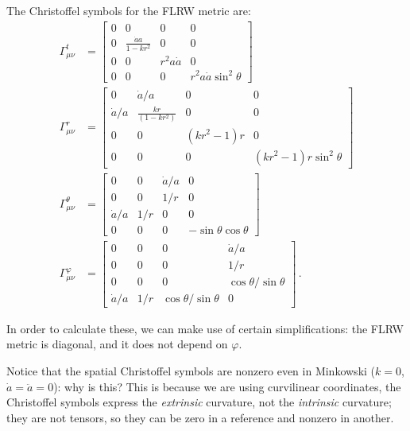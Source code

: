 \documentclass[main.tex]{subfiles}
\begin{document}
\begin{claim}
The Christoffel symbols for the FLRW metric are: 
%
\begin{subequations}
\begin{align}
\Gamma^{t}_{\mu \nu } &= \left[\begin{array}{cccc}
0 & 0 & 0 & 0 \\ 
0 & \frac{\dot{a}a}{1-kr^2} & 0 & 0 \\ 
0 & 0 & r^2a \dot{a} & 0 \\ 
0 & 0 & 0 & r^2 a \dot{a} \sin^2\theta 
\end{array}\right] \\
\Gamma^{r}_{\mu \nu } &= \left[\begin{array}{cccc}
0 & \dot{a} / a & 0 & 0 \\ 
\dot{a} / a & \frac{kr}{(1-kr^2)} & 0 & 0 \\ 
0 & 0 & (kr^2-1)r & 0 \\ 
0 & 0 & 0 & (kr^2-1)r \sin^2\theta 
\end{array}\right] \\
\Gamma^{\theta }_{\mu \nu } &= \left[\begin{array}{cccc}
0 & 0 & \dot{a} / a & 0 \\ 
0 & 0 & 1 / r & 0 \\ 
\dot{a} / a & 1/r & 0 & 0 \\ 
0 & 0 & 0 & - \sin \theta \cos \theta 
\end{array}\right] \\
\Gamma^{\varphi }_{\mu \nu } &= \left[\begin{array}{cccc}
0 & 0 & 0 & \dot{a} / a \\ 
0 & 0 & 0 & 1/r \\ 
0 & 0 & 0 & \cos \theta  /\sin \theta  \\ 
\dot{a} /a  & 1/r & \cos \theta  /\sin \theta  & 0
\end{array}\right]
\,.
\end{align}
\end{subequations}
\end{claim}

In order to calculate these, we can make use of certain simplifications: the FLRW metric is diagonal, and it does not depend on \(\varphi \).

Notice that the spatial Christoffel symbols are nonzero even in Minkowski (\(k=0\), \(\dot{a} = \ddot{a} =  0\)): why is this?
This is because we are using curvilinear coordinates, the Christoffel symbols express the \emph{extrinsic} curvature, not the \emph{intrinsic} curvature; they are not tensors, so they can be zero in a reference and nonzero in another. 
\end{document}
